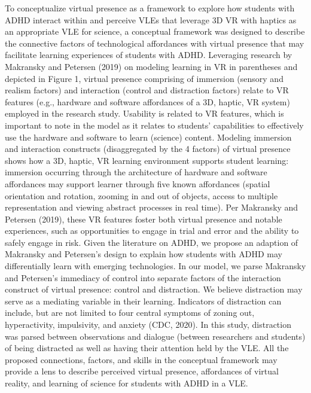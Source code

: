 \documentclass[11.5pt]{sig-alternate} %
\begin{document}
\begin{large}
To conceptualize virtual presence as a framework to explore how students with ADHD interact within and perceive VLEs that leverage 3D VR with haptics as an appropriate VLE for science, a conceptual framework was designed to describe the connective factors of technological affordances with virtual presence that may facilitate learning experiences of students with ADHD. Leveraging research by Makransky and Petersen (2019) on modeling learning in VR in parentheses and depicted in Figure 1, virtual presence comprising of immersion (sensory and realism factors) and interaction (control and distraction factors) relate to VR features (e.g., hardware and software affordances of a 3D, haptic, VR system) employed in the research study. Usability is related to VR features, which is important to note in the model as it relates to students’ capabilities to effectively use the hardware and software to learn (science) content. Modeling immersion and interaction constructs (disaggregated by the 4 factors) of virtual presence shows how a 3D, haptic, VR learning environment supports student learning: immersion occurring through the architecture of hardware and software affordances may support learner through five known affordances (spatial orientation and rotation, zooming in and out of objects, access to multiple representation and viewing abstract processes in real time).  Per Makransky and Petersen (2019), these VR features foster both virtual presence and notable experiences, such as opportunities to engage in trial and error and the ability to safely engage in risk. Given the literature on ADHD, we propose an adaption of Makransky and Petersen’s design to explain how students with ADHD may differentially learn with emerging technologies. In our model, we parse Makransky and Petersen’s immediacy of control into separate factors of the interaction construct of virtual presence: control and distraction.  We believe distraction may serve as a mediating variable in their learning. Indicators of distraction can include, but are not limited to four central symptoms of zoning out, hyperactivity, impulsivity, and anxiety (CDC, 2020). In this study, distraction was parsed between observations and dialogue (between researchers and students) of being distracted as well as having their attention held by the VLE. All the proposed connections, factors, and skills in the conceptual framework may provide a lens to describe perceived virtual presence, affordances of virtual reality, and learning of science for students with ADHD in a VLE. 


\end{large}
\end{document}
